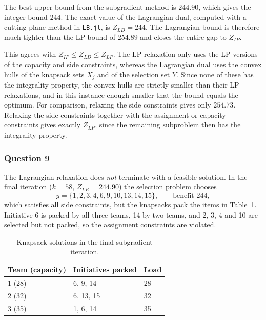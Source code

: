 The best upper bound from the subgradient method is $244.90$, which gives
the integer bound $244$. The exact value of the Lagrangian dual, computed with
a cutting-plane method in \texttt{LB.jl}, is $Z_{LD} = 244$. The Lagrangian
bound is therefore much tighter than the LP bound of $254.89$ and closes the
entire gap to $Z_{IP}$.

This agrees with $Z_{IP} \le Z_{LD} \le Z_{LP}$. The LP relaxation only uses
the LP versions of the capacity and side constraints, whereas the Lagrangian
dual uses the convex hulls of the knapsack sets $X_j$ and of the selection
set $Y$. Since none of these has the integrality property, the convex hulls
are strictly smaller than their LP relaxations, and in this instance enough
smaller that the bound equals the optimum. For comparison, relaxing the side
constraints gives only $254.73$. Relaxing the side constraints together with
the assignment or capacity constraints gives exactly $Z_{LP}$, since the
remaining subproblem then has the integrality property.


\subsubsection*{Question 9}

The Lagrangian relaxation does \emph{not} terminate with a feasible solution.
In the final iteration ($k = 58$, $Z_{LR} = 244.90$) the selection problem
chooses
\[
y = \{1, 2, 3, 4, 6, 9, 10, 13, 14, 15\}, \qquad \text{benefit } 244,
\]
which satisfies all side constraints, but the knapsacks pack the items in
Table~\ref{tab:q9lr}. Initiative 6 is packed by all three teams, 14 by two
teams, and 2, 3, 4 and 10 are selected but not packed, so the assignment
constraints are violated.

\begin{table}[h]
\centering
\begin{tabular}{@{}lll@{}}
\toprule
Team (capacity) & Initiatives packed & Load \\
\midrule
1 (28) & 6, 9, 14 & 28 \\
2 (32) & 6, 13, 15 & 32 \\
3 (35) & 1, 6, 14 & 35 \\
\bottomrule
\end{tabular}
\caption{Knapsack solutions in the final subgradient iteration.}
\label{tab:q9lr}
\end{table}


